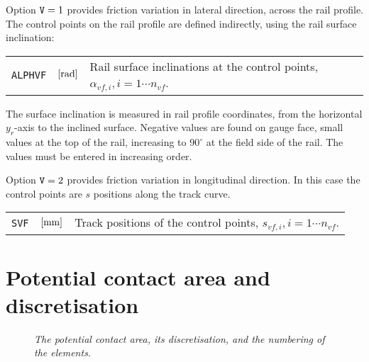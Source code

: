 \documentclass[12pt]{report}
\renewcommand{\magenta}[1]{}
\newenvironment{inputvars}{\vspace{0.4\baselineskip}%

\begin{tabular}{>{\raggedright}p{22mm}p{19mm}p{113mm}}}{
\end{tabular}

}
\newcommand{\inpvar}[3]{{\small\tt #1} & $#2$ & #3 \\[1ex]}
\begin{document}
Option ${\tt V}=1$ provides friction variation in lateral
direction, across the rail profile. The control points on the rail
profile are defined indirectly, using the rail surface inclination:
\begin{inputvars}
\inpvar{ALPHVF}{\bunit{rad}}{Rail surface inclinations at the control points,
        $\alpha_{vf,i}, i=1\cdots n_{vf}$.}
\end{inputvars}
The surface inclination is measured in rail profile coordinates, from the
horizontal $y_r$-axis to the inclined surface. Negative values are found on
gauge face, small values at the top of the rail, increasing to $90^\circ$ at
the field side of the rail. The values must be entered in increasing order.

Option ${\tt V}=2$ provides friction variation in longitudinal
direction. In this case the control points are $s$ positions along the
track curve.
\begin{inputvars}
\inpvar{SVF}{\bunit{mm}}{Track positions of the control points,
        $s_{vf,i}, i=1\cdots n_{vf}$.}
\end{inputvars}

\magenta{
Option ${\tt V}=3$ provides friction variation in module 3, in lateral
($y_c$) direction of the contact patch. This requires that the parameters
for the friction laws are given for each row of the grid, using
${\tt NVF}={\tt MY}$ and avoiding any interpolation.
}

\section{Potential contact area and discretisation}
\label{sec:pot_con}

\begin{figure}[bt]
\centering
{}
\caption{\em The potential contact area, its discretisation, and the
        numbering of the elements.}
\label{fig:potcon_discr}
\end{figure}
\end{document}
